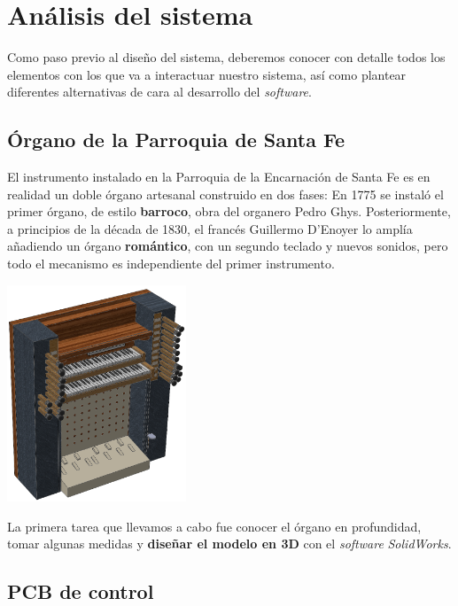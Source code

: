 \documentclass[10pt,a4paper]{article}
\begin{document}
	
	\section{Análisis del sistema}

	Como paso previo al diseño del sistema, deberemos conocer con detalle todos
	los elementos con los que va a interactuar nuestro sistema, así como
	plantear diferentes alternativas de cara al desarrollo del
	\textit{software}.

	\subsection{Órgano de la Parroquia de Santa Fe}

	El instrumento instalado en la Parroquia de la Encarnación de Santa Fe es en
	realidad un doble órgano artesanal construido en dos fases: En 1775 se
	instaló el primer órgano, de estilo \textbf{barroco}, obra del organero
	Pedro Ghys. Posteriormente, a principios de la década de 1830, el francés
	Guillermo D'Enoyer lo amplía añadiendo un órgano \textbf{romántico}, con un
	segundo teclado y nuevos sonidos, pero todo el mecanismo es independiente
	del primer instrumento.
	

	\begin{multicols}{2}
		\includegraphics[width=0.4\textwidth]{images/organo}
		
		La primera tarea que llevamos a cabo fue 
		conocer el órgano en profundidad, tomar 
		algunas medidas y \textbf{diseñar el modelo en 3D} 
		con el \textit{software} \textit{SolidWorks}.
	\end{multicols}
	
	\subsection{PCB de control}
	
\end{document}

